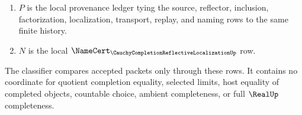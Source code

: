 \begin{definition}
\begin{enumerate}
\item $P$ is the local provenance ledger tying the source, reflector, inclusion, factorization, localization, transport, replay, and naming rows to the same finite history.
\item $N$ is the local $\NameCert_{\CauchyCompletionReflectiveLocalizationUp}$ row.
\end{enumerate}
The classifier compares accepted packets only through these rows. It contains no coordinate for quotient completion equality, selected limits, host equality of completed objects, countable choice, ambient completeness, or full $\RealUp$ completeness.
\end{definition}

